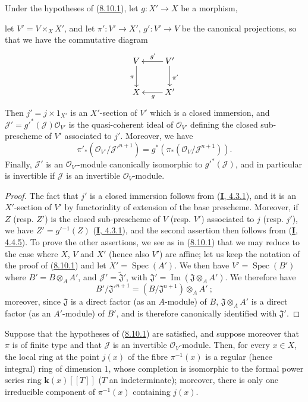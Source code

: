 \begin{lemma}[8.10.2]
\label{II.8.10.2}
Under the hypotheses of \textup{(\hyperref[II.8.10.1]{8.10.1})}, let
$g:X'\to X$ be a morphism,

let $V'=V\times_X X'$, and let $\pi':V'\to X'$,
$g':V'\to V$ be the canonical projections, so that we have the commutative
diagram
\[
  \xymatrix{
    V\ar[d]_{\pi} & V'\ar[l]_{g'}\ar[d]^{\pi'}\\
    X & X'\ar[l]^{g}
  }
\]
Then $j'=j\times1_{X'}$ is an $X'$-section of $V'$ which is a closed
immersion, and $\mathcal{J}'=g'^*(\mathcal{J})\mathcal{O}_{V'}$ is the
quasi-coherent ideal of $\mathcal{O}_{V'}$ defining the closed sub-prescheme
of $V'$ associated to $j'$. Moreover, we have
\[
  \pi'_*(\mathcal{O}_{V'}/\mathcal{J}'^{n+1})
  =g^*(\pi_*(\mathcal{O}_V/\mathcal{J}^{n+1})).
\]
Finally, $\mathcal{J}'$ is an $\mathcal{O}_{V'}$-module canonically isomorphic
to $g'^*(\mathcal{J})$, and in particular is invertible if $\mathcal{J}$ is
an invertible $\mathcal{O}_V$-module.
\end{lemma}

\begin{proof}
The fact that $j'$ is a closed immersion follows from
(\hyperref[I.4.3.1]{\textbf{I}, 4.3.1}), and it is an $X'$-section of $V'$ by
functoriality of extension of the base prescheme. Moreover, if $Z$ (resp.
$Z'$) is the closed sub-prescheme of $V$ (resp. $V'$) associated to $j$ (resp.
$j'$), we have $Z'=g'{}^{-1}(Z)$
(\hyperref[I.4.3.1]{\textbf{I}, 4.3.1}), and the second assertion then follows from
(\hyperref[I.4.4.5]{\textbf{I}, 4.4.5}). To prove the other assertions, we
see as in (\hyperref[II.8.10.1]{8.10.1}) that we may reduce to the case
where $X$, $V$ and $X'$ (hence also $V'$) are affine; let us keep the
notation of the proof of (\hyperref[II.8.10.1]{8.10.1}) and let
$X'=\operatorname{Spec}(A')$. We then have $V'=\operatorname{Spec}(B')$ where
$B'=B\otimes_A A'$, and $\mathcal{J}'=\widetilde{\mathfrak{J}}'$, with
$\mathfrak{J}'=\operatorname{Im}(\mathfrak{J}\otimes_A A')$. We therefore have
\[
  B'/\mathfrak{J}'^{n+1}=(B/\mathfrak{J}^{n+1})\otimes_A A'~;
\]
moreover, since $\mathfrak{J}$ is a direct factor (as an $A$-module) of
$B$, $\mathfrak{J}\otimes_A A'$ is a direct factor (as an $A'$-module)
of $B'$, and is therefore canonically identified with $\mathfrak{J}'$.
\end{proof}

\begin{corollary}[8.10.3]
\label{II.8.10.3}
Suppose that the hypotheses of \textup{(\hyperref[II.8.10.1]{8.10.1})} are
satisfied, and suppose moreover that $\pi$ is of finite type and that
$\mathcal{J}$ is an invertible $\mathcal{O}_V$-module. Then, for every
$x\in X$, the local ring at the point $j(x)$ of the fibre $\pi^{-1}(x)$ is a
regular (hence integral) ring of dimension 1, whose completion is isomorphic
to the formal power series ring $\boldsymbol{k}(x)[[T]]$ ($T$ an indeterminate); moreover,
there is only one irreducible component of $\pi^{-1}(x)$ containing $j(x)$.
\end{corollary}

